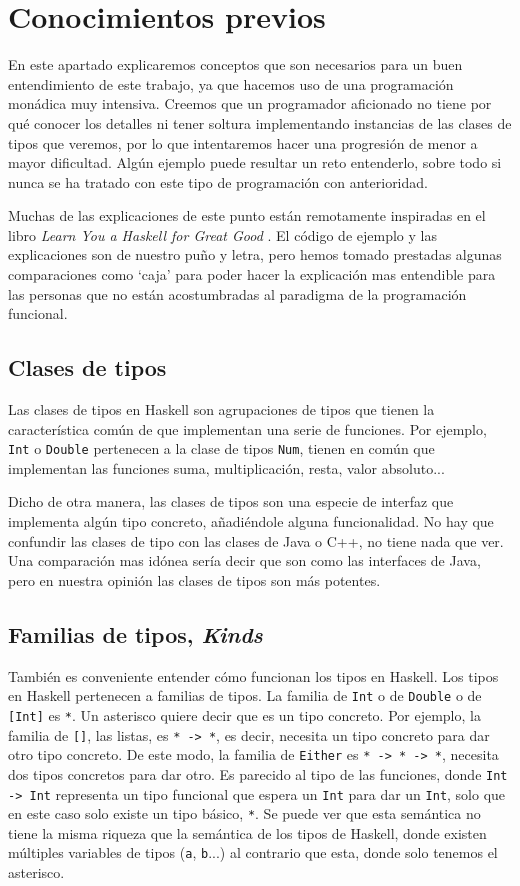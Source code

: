 \documentclass[class=article, crop=false]{standalone}
\begin{document}
\section{Conocimientos previos}\label{sec:con_prev}
En este apartado explicaremos conceptos que son necesarios para un buen entendimiento de este
trabajo, ya que hacemos uso de una programación monádica muy intensiva. Creemos que un
programador aficionado no tiene por qué conocer los detalles ni tener soltura implementando
instancias de las clases de tipos que veremos, por lo que intentaremos hacer una progresión
de menor a mayor dificultad. Algún ejemplo puede resultar un reto entenderlo, sobre todo si
nunca se ha tratado con este tipo de programación con anterioridad.

Muchas de las explicaciones de este punto están remotamente inspiradas en el libro\textit{
Learn You a Haskell for Great Good} \cite{Lipovaca:2011:LYH:2018642}. El código de ejemplo y
las explicaciones son de nuestro puño y letra, pero hemos tomado prestadas algunas
comparaciones como `caja' para poder hacer la explicación mas entendible para las personas
que no están acostumbradas al paradigma de la programación funcional.

\subsection{Clases de tipos}
Las clases de tipos en Haskell son agrupaciones de tipos que tienen la característica común
de que implementan una serie de funciones. Por ejemplo, \verb`Int` o \verb`Double` pertenecen
a la clase de tipos \verb`Num`, tienen en común que implementan las funciones suma,
multiplicación, resta, valor absoluto...

Dicho de otra manera, las clases de tipos son una especie de interfaz que implementa algún
tipo concreto, añadiéndole alguna funcionalidad. No hay que confundir las clases de tipo con
las clases de Java o C++, no tiene nada que ver. Una comparación mas idónea sería decir que
son como las interfaces de Java, pero en nuestra opinión las clases de tipos son más
potentes.

\subsection{Familias de tipos, \textit{Kinds}}
También es conveniente entender cómo funcionan los tipos en Haskell. Los tipos en Haskell
pertenecen a familias de tipos. La familia de \verb`Int` o de \verb`Double` o de \verb`[Int]`
es \verb`*`. Un asterisco quiere decir que es un tipo concreto. Por ejemplo, la familia de
\verb`[]`, las listas, es \verb`* -> *`, es decir, necesita un tipo concreto para dar otro
tipo concreto. De este modo, la familia de \verb`Either` es \verb`* -> * -> *`, necesita dos
tipos concretos para dar otro. Es parecido al tipo de las funciones, donde \verb`Int -> Int`
representa un tipo funcional que espera un \verb`Int` para dar un \verb`Int`, solo que en
este caso solo existe un tipo básico, \verb`*`. Se puede ver que esta semántica no tiene la
misma riqueza que la semántica de los tipos de Haskell, donde existen múltiples variables de
tipos (\verb`a`, \verb`b`...) al contrario que esta, donde solo tenemos el asterisco.
\end{document}
